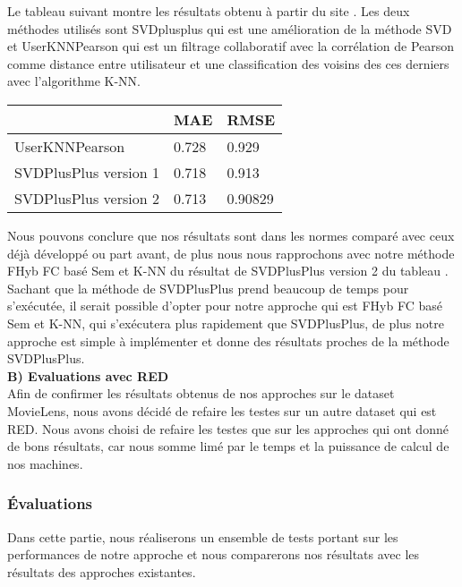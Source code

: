 Le tableau suivant montre les résultats obtenu à partir du site \cite{ref42}.
Les deux méthodes utilisés sont SVDplusplus qui est une amélioration de la méthode SVD et UserKNNPearson qui est un filtrage collaboratif avec la corrélation de Pearson comme distance entre utilisateur et une classification des voisins des ces derniers avec l'algorithme K-NN.
\begin{table}[H]
	\centering
	\begin{tabular}{|l|l|l|}
		\hline
		& MAE & RMSE \\ \hline
		UserKNNPearson & 0.728 & 0.929 \\ \hline
		SVDPlusPlus version 1& 0.718 & 0.913 \\ \hline
		SVDPlusPlus  version 2& \cellcolor[HTML]{67FD9A} 0.713 & \cellcolor[HTML]{67FD9A}0.90829	\\ \hline
	\end{tabular}
 \label{tab:mymedia}
\end{table}
Nous pouvons conclure que nos résultats sont dans les normes comparé avec ceux déjà développé ou part avant, de plus nous nous rapprochons avec notre méthode FHyb FC basé Sem et K-NN du résultat de SVDPlusPlus version 2 du tableau .
Sachant que la méthode de SVDPlusPlus prend beaucoup de temps pour s'exécutée, il serait possible d'opter pour notre approche qui est FHyb FC basé Sem et K-NN, qui s'exécutera plus rapidement que SVDPlusPlus, de plus notre approche est simple à implémenter et donne des résultats proches de la méthode SVDPlusPlus.\\


\textbf{B) Evaluations avec RED}\\
Afin de confirmer les résultats obtenus de nos approches sur le dataset MovieLens, nous avons décidé de refaire les testes sur un autre dataset qui est RED.
Nous avons choisi de refaire les testes que sur les approches qui ont donné de bons résultats, car nous somme limé par le temps et la puissance de calcul de nos machines.
\subsubsection*{Évaluations}
Dans cette partie, nous réaliserons un ensemble de tests portant sur les performances de notre approche et nous comparerons nos résultats avec les résultats des approches existantes. \\

